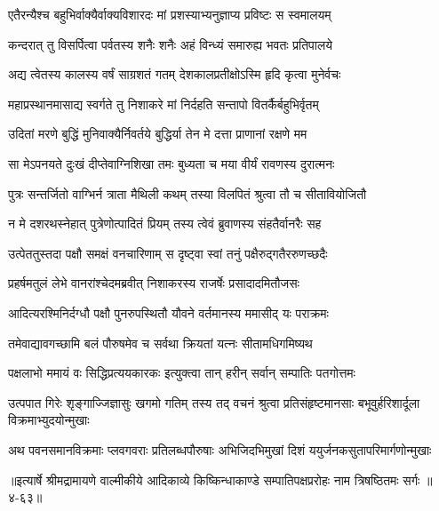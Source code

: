 
\twolineshloka
{एतैरन्यैश्च बहुभिर्वाक्यैर्वाक्यविशारदः}
{मां प्रशस्याभ्यनुज्ञाप्य प्रविष्टः स स्वमालयम्} %

\twolineshloka
{कन्दरात् तु विसर्पित्वा पर्वतस्य शनैः शनैः}
{अहं विन्ध्यं समारुह्य भवतः प्रतिपालये} %

\twolineshloka
{अद्य त्वेतस्य कालस्य वर्षं साग्रशतं गतम्}
{देशकालप्रतीक्षोऽस्मि हृदि कृत्वा मुनेर्वचः} %

\twolineshloka
{महाप्रस्थानमासाद्य स्वर्गते तु निशाकरे}
{मां निर्दहति सन्तापो वितर्कैर्बहुभिर्वृतम्} %

\twolineshloka
{उदितां मरणे बुद्धिं मुनिवाक्यैर्निवर्तये}
{बुद्धिर्या तेन मे दत्ता प्राणानां रक्षणे मम} %

\twolineshloka
{सा मेऽपनयते दुःखं दीप्तेवाग्निशिखा तमः}
{बुध्यता च मया वीर्यं रावणस्य दुरात्मनः} %

\twolineshloka
{पुत्रः सन्तर्जितो वाग्भिर्न त्राता मैथिली कथम्}
{तस्या विलपितं श्रुत्वा तौ च सीतावियोजितौ} %

\twolineshloka
{न मे दशरथस्नेहात् पुत्रेणोत्पादितं प्रियम्}
{तस्य त्वेवं ब्रुवाणस्य संहतैर्वानरैः सह} %

\twolineshloka
{उत्पेततुस्तदा पक्षौ समक्षं वनचारिणाम्}
{स दृष्ट्वा स्वां तनुं पक्षैरुद्गतैररुणच्छदैः} %

\twolineshloka
{प्रहर्षमतुलं लेभे वानरांश्चेदमब्रवीत्}
{निशाकरस्य राजर्षेः प्रसादादमितौजसः} %

\twolineshloka
{आदित्यरश्मिनिर्दग्धौ पक्षौ पुनरुपस्थितौ}
{यौवने वर्तमानस्य ममासीद् यः पराक्रमः} %

\twolineshloka
{तमेवाद्यावगच्छामि बलं पौरुषमेव च}
{सर्वथा क्रियतां यत्नः सीतामधिगमिष्यथ} %

\twolineshloka
{पक्षलाभो ममायं वः सिद्धिप्रत्ययकारकः}
{इत्युक्त्वा तान् हरीन् सर्वान् सम्पातिः पतगोत्तमः} %

\threelineshloka
{उत्पपात गिरेः शृङ्गाज्जिज्ञासुः खगमो गतिम्}
{तस्य तद् वचनं श्रुत्वा प्रतिसंहृष्टमानसाः}
{बभूवुर्हरिशार्दूला विक्रमाभ्युदयोन्मुखाः} %

\twolineshloka
{अथ पवनसमानविक्रमाः प्लवगवराः प्रतिलब्धपौरुषाः}
{अभिजिदभिमुखां दिशं ययुर्जनकसुतापरिमार्गणोन्मुखाः} %


॥इत्यार्षे श्रीमद्रामायणे वाल्मीकीये आदिकाव्ये किष्किन्धाकाण्डे सम्पातिपक्षप्ररोहः नाम त्रिषष्ठितमः सर्गः ॥४-६३॥
